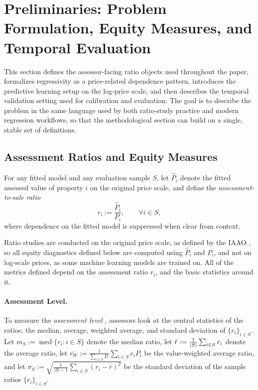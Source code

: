 \documentclass[12pt, draft]{article}
\theoremstyle{plain}
\theoremstyle{definition}
\newcommand{\1}{\mathbf{1}}
\begin{document}
{
\color{gray}
\section{Preliminaries: Problem Formulation, Equity Measures, and Temporal Evaluation}
\label{sec:problem_setting}

This section defines the assessor-facing ratio objects used throughout the paper, formalizes regressivity as a price-related dependence pattern, introduces the predictive learning setup on the log-price scale, and then describes the temporal validation setting used for calibration and evaluation. The goal is to describe the problem in the same language used by both ratio-study practice and modern regression workflows, so that the methodological section can build on a single, stable set of definitions.

\subsection{Assessment Ratios and Equity Measures}
\label{subsec:equity_metrics}

For any fitted model and any evaluation sample $S$, let $\widehat P_i$ denote the fitted assessed value of property $i$ on the original price scale, and define the \emph{assessment-to-sale ratio}
\begin{equation}
\label{eq:ratio_def}
r_i := \frac{\widehat P_i}{P_i} ,
\qquad \forall i\in S,
\end{equation}
where dependence on the fitted model is suppressed when clear from context.

Ratio studies are conducted on the original price scale, as defined by the IAAO \cite{IAAO2025ExposureRatio}, so all equity diagnostics defined below are computed using $\hat P_i$ and $P_i$, and not on log-scale prices, as some machine learning models are trained on. All of the metrics defined depend on the assessment ratio $r_i$, and the basic statistics around it.

\paragraph{Assessment Level.} To measure the \textit{assessment level} \cite{IAAO2025ExposureRatio}, assessors look at the central statistics of the ratios; the median, average, weighted average, and standard deviation of $\{r_i\}_{i\in S}$.
Let
$
m_S := \operatorname{med}\{r_i: i\in S\}
$
denote the median ratio, let $\Bar{r}:= \frac{1}{|S|}\sum_{i\in S} r_i$ denote the average ratio, let $\overline{r_W}:=\frac{1}{\sum_{i\in S}P_i}\sum_{i\in S}r_i P_i$ be the value-weighted average ratio, and let $\sigma_S:=\sqrt{\frac{1}{|S|-1}\sum_{i\in S} (r_i - \bar r)^2}$ be the standard deviation of  the sample ratios $\{r_i\}_{i \in S}$.

}
\end{document}
